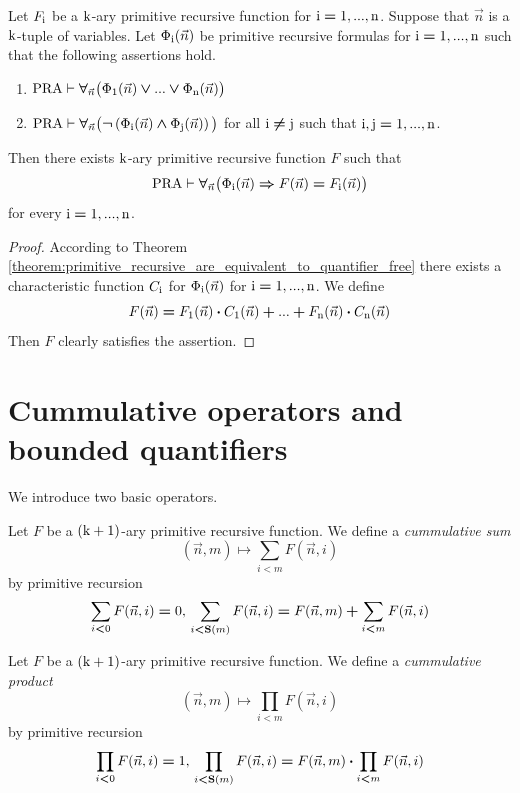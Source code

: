 \documentclass[10pt]{amsart}
\newcommand{\mforall}{\boldsymbol{\forall}}
\newcommand{\mra}{\boldsymbol{\Rightarrow}}
\newcommand{\mand}{\boldsymbol{\wedge}}
\newcommand{\mor}{\boldsymbol{\vee}}
\newcommand{\mneg}{\boldsymbol{\neg}}
\newcommand{\mle}{\boldsymbol{<}}
\newcommand{\meq}{\boldsymbol{=}}
\newcommand{\mneq}{\boldsymbol{\neq}}
\newcommand{\mplus}{\boldsymbol{+}}
\newcommand{\mdot}{\boldsymbol{\cdot}}
\begin{document}
\begin{corollary}\label{corollary:definition_by_primitive_recursive_cases}
  Let $F_{\rm{i}}$ be a $\rm{k}$-ary primitive recursive function for $\rm{i}\meq\rm{1},...,\rm{n}$. Suppose that $\vec{n}$ is a $\rm{k}$-tuple of variables. Let $\Phi_{\rm{i}}(\vec{n})$ be primitive recursive formulas for $\rm{i} \meq \rm{1},...,\rm{n}$ such that the following assertions hold.
	\begin{enumerate}[label=\emph{\textbf{(\arabic*)}}, leftmargin=3.0em]
		\item $\mathrm{PRA}\vdash \mforall_{\vec{n}}\big(\Phi_{\rm{1}}(\vec{n}) \mor ... \mor \Phi_{\rm{n}}(\vec{n})\big)$
    \item $\mathrm{PRA}\vdash \mforall_{\vec{n}}\big(\mneg \left(\Phi_{\rm{i}}(\vec{n})\mand \Phi_{\rm{j}}(\vec{n})\right)\big)$ for all $\rm{i} \mneq \rm{j}$ such that $\rm{i},\rm{j}\meq\rm{1},...,\rm{n}$.
	\end{enumerate}
	Then there exists $\rm{k}$-ary primitive recursive function $F$ such that
	$$\mathrm{PRA} \vdash \mforall_{\vec{n}}\big(\Phi_{\rm{i}}(\vec{n}) \mra F(\vec{n}) \meq F_{\rm{i}}(\vec{n})\big)$$
  for every $\rm{i}\meq\rm{1},...,\rm{n}$.
\end{corollary}
\begin{proof}
  According to Theorem \ref{theorem:primitive_recursive_are_equivalent_to_quantifier_free} there exists a characteristic function $C_{\rm{i}}$ for $\Phi_{\rm{i}}(\vec{n})$ for $\rm{i}\meq\rm{1},...,\rm{n}$. We define
	$$F(\vec{n}) \meq F_{\rm{1}}(\vec{n}) \mdot C_{\rm{1}}(\vec{n}) \mplus ... \mplus F_{\rm{n}}(\vec{n}) \mdot C_{\rm{n}}(\vec{n})$$
	Then $F$ clearly satisfies the assertion.
\end{proof}

\section{Cummulative operators and bounded quantifiers}
\noindent
We introduce two basic operators.

\begin{definition}
	Let $F$ be a $\rm{(k + 1)}$-ary primitive recursive function. We define a \textit{cummulative sum}
	$$(\vec{n},m) \mapsto \sum_{i \mle m}F(\vec{n},i)$$
	by primitive recursion
	$$\sum_{i \mle 0}F(\vec{n},i) \meq 0,\,\sum_{i \mle \bd{S}(m)}F(\vec{n},i) \meq F(\vec{n},m) \mplus \sum_{i \mle m}F(\vec{n},i)$$
\end{definition}

\begin{definition}
	Let $F$ be a $\rm{(k + 1)}$-ary primitive recursive function. We define a \textit{cummulative product}
	$$(\vec{n},m) \mapsto \prod_{i \mle m}F(\vec{n},i)$$
	by primitive recursion
	$$\prod_{i \mle 0}F(\vec{n},i) \meq 1,\,\prod_{i \mle \bd{S}(m)}F(\vec{n},i) \meq F(\vec{n},m)\mdot \prod_{i \mle m}F(\vec{n},i)$$
\end{definition}
\end{document}
